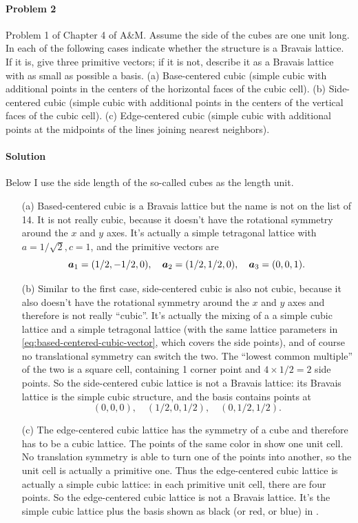 \documentclass[hyperref, a4paper]{article}
\begin{document}
\paragraph{Problem 2} Problem 1 of Chapter 4 of A\&M. Assume the side of the cubes are one unit long.
In each of the following cases indicate whether the structure is a Bravais lattice. If it is, give three primitive vectors; if it is not, describe it as a Bravais lattice with as small as possible a basis.
(a) Base-centered cubic (simple cubic with additional points in the centers of the horizontal faces of the cubic cell).
(b) Side-centered cubic (simple cubic with additional points in the centers of the vertical faces of the cubic cell).
(c) Edge-centered cubic (simple cubic with additional points at the midpoints of the lines joining nearest neighbors).

\paragraph{Solution} 
Below I use the side length of the so-called cubes as the length unit.
\begin{itemize}
\item[(a)] Based-centered cubic is a Bravais lattice but the name is not on the list of 14. 
It is not really cubic, 
because it doesn't have the rotational symmetry around the $x$ and $y$ axes.
It's actually a simple tetragonal lattice with $a= 1 / \sqrt{2}, c = 1$, and
the primitive vectors are 
\begin{equation}
    \vb*{a}_1 = (1/2, -1/2, 0), \quad \vb*{a}_2 = (1/2, 1/2, 0), \quad \vb*{a}_3 = (0, 0, 1).
    \label{eq:based-centered-cubic-vector}
\end{equation}
\item[(b)] Similar to the first case, 
side-centered cubic is also not cubic,
because it also doesn't have the rotational symmetry around the $x$ and $y$ axes
and therefore is not really ``cubic''.
It's actually the mixing of a a simple cubic lattice and a simple tetragonal lattice 
(with the same lattice parameters in \eqref{eq:based-centered-cubic-vector}, 
which covers the side points),
and of course no translational symmetry can switch the two.
The ``lowest common multiple'' of the two is a square cell,
containing 1 corner point and $4 \times 1/2 = 2$ side points.
So the side-centered cubic lattice is not a Bravais lattice:
its Bravais lattice is the simple cubic structure,
and the basis contains points at 
\[
    (0, 0, 0), \quad (1/2, 0, 1/2), \quad (0, 1/2, 1/2).
\]
\item[(c)] The edge-centered cubic lattice has the symmetry of a cube and therefore has to be a cubic lattice. 
The points of the same color in  show one unit cell.
No translation symmetry is able to turn one of the points into another,
so the unit cell is actually a primitive one.
Thus the edge-centered cubic lattice is actually a simple cubic lattice: 
in each primitive unit cell,
there are four points.
So the edge-centered cubic lattice is not a Bravais lattice.
It's the simple cubic lattice plus the basis shown as black (or red, or blue) in 
.
\end{itemize}
\end{document}
